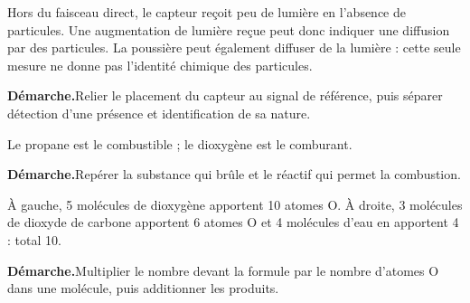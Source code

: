 \par\noindent\begin{minipage}{\linewidth}Hors du faisceau direct, le capteur reçoit peu de lumière en l’absence de particules. Une augmentation de lumière reçue peut donc indiquer une diffusion par des particules. La poussière peut également diffuser de la lumière : cette seule mesure ne donne pas l’identité chimique des particules.\par\smallskip\textbf{Démarche.}\enspace Relier le placement du capteur au signal de référence, puis séparer détection d’une présence et identification de sa nature.\par{}\end{minipage}\par
{}
\par\noindent\begin{minipage}{\linewidth}Le propane est le combustible ; le dioxygène est le comburant.\par\smallskip\textbf{Démarche.}\enspace Repérer la substance qui brûle et le réactif qui permet la combustion.\par{}\end{minipage}\par
\par\noindent\begin{minipage}{\linewidth}À gauche, 5 molécules de dioxygène apportent 10 atomes O. À droite, 3 molécules de dioxyde de carbone apportent 6 atomes O et 4 molécules d’eau en apportent 4 : total 10.\par\smallskip\textbf{Démarche.}\enspace Multiplier le nombre devant la formule par le nombre d’atomes O dans une molécule, puis additionner les produits.\par{}\end{minipage}\par
